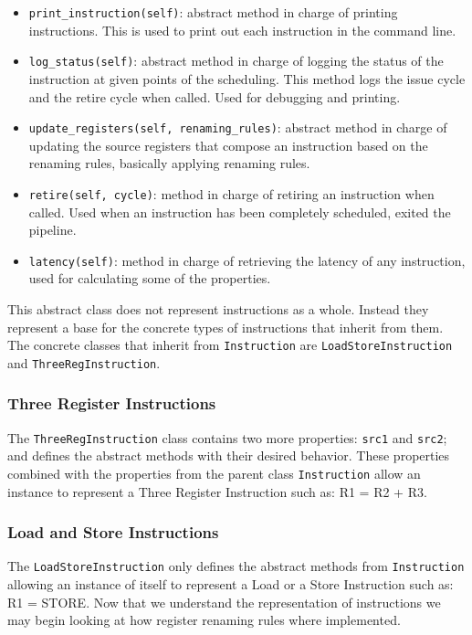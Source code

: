 \documentclass{article}
\begin{document}
\begin{itemize}
    \item \lstinline|print_instruction(self)|: abstract method in charge of printing instructions. This is used to print out each instruction in the command line.
    \item \lstinline|log_status(self)|: abstract method in charge of logging the status of the instruction at given points of the scheduling. This method logs the issue cycle and the retire cycle when called. Used for debugging and printing.
    \item \lstinline|update_registers(self, renaming_rules)|: abstract method in charge of updating the source registers that compose an instruction based on the renaming rules, basically applying renaming rules.
    \item \lstinline|retire(self, cycle)|: method in charge of retiring an instruction when called. Used when an instruction has been completely scheduled, exited the pipeline.
    \item \lstinline|latency(self)|: method in charge of retrieving the latency of any instruction, used for calculating some of the properties.
\end{itemize}

This abstract class does not represent instructions as a whole. Instead they represent a base for the concrete types of instructions that inherit from them. The concrete classes that inherit from \lstinline|Instruction| are \lstinline|LoadStoreInstruction| and \lstinline|ThreeRegInstruction|.
\subsubsection{Three Register Instructions}
The \lstinline|ThreeRegInstruction| class contains two more properties: \lstinline|src1| and \lstinline|src2|; and defines the abstract methods with their desired behavior. These properties combined with the properties from the parent class \lstinline|Instruction| allow an instance to represent a Three Register Instruction such as: R1 = R2 + R3.

\subsubsection{Load and Store Instructions}
The \lstinline|LoadStoreInstruction| only defines the abstract methods from \lstinline|Instruction| allowing an instance of itself to represent a Load or a Store Instruction such as: R1 = STORE. Now that we understand the representation of instructions we may begin looking at how register renaming rules where implemented. 
\end{document}
